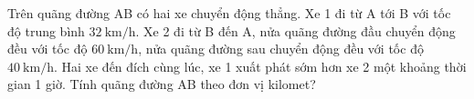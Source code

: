 \begin{ex}
Trên quãng đường AB có hai xe chuyển động thẳng. Xe 1 đi từ A tới B với tốc độ trung bình $\SI{32}{\kilo\meter/\hour}$. Xe 2 đi từ B đến A, nửa quãng đường đầu chuyển động đều với tốc độ $\SI{60}{\kilo\meter/\hour}$, nửa quãng đường sau chuyển động đều với tốc độ $\SI{40}{\kilo\meter/\hour}$. Hai xe đến đích cùng lúc, xe 1 xuất phát sớm hơn xe 2 một khoảng thời gian 1 giờ. Tính quãng đường AB theo đơn vị kilomet?
\end{ex}
